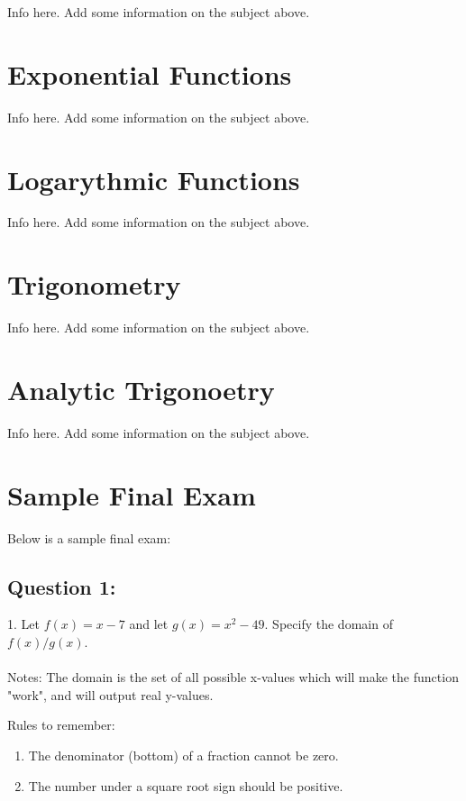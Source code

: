 \documentclass[12pt, letterpaper]{article}
\begin{document}
Info here. Add some information on the subject above. 

\section{Exponential Functions}

Info here. Add some information on the subject above. 

\section{Logarythmic Functions}

Info here. Add some information on the subject above. 

\section{Trigonometry}

Info here. Add some information on the subject above. 

\section{Analytic Trigonoetry}

Info here. Add some information on the subject above. 


\section{Sample Final Exam}
Below is a sample final exam:

\subsection{Question 1:}
1. Let $f(x)=x-7$ and let $g(x)=x^2-49$. Specify the domain of $f(x)/g(x)$.\\\\
Notes: The domain is the set of all possible x-values which will make the 
function "work", and will output real y-values.

Rules to remember:
\begin{enumerate}
  \item The denominator (bottom) of a fraction cannot be zero.
  \item The number under a square root sign should be positive.
\end{enumerate}
\end{document}
